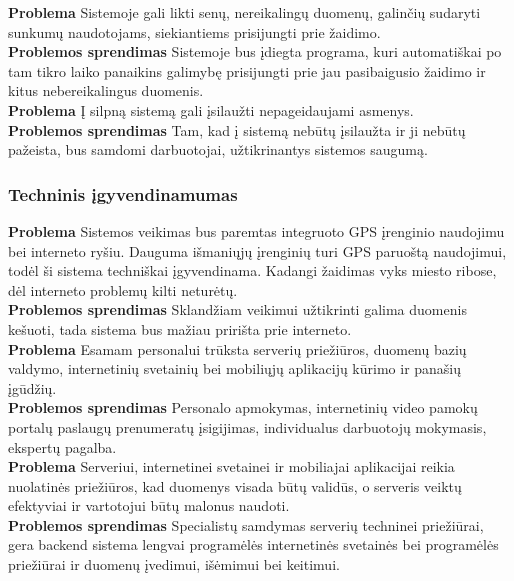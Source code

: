 \documentclass{VUMIFPSkursinis}
\begin{document}
		\noindent \textbf{Problema} Sistemoje gali likti senų, nereikalingų duomenų, galinčių sudaryti sunkumų naudotojams, siekiantiems prisijungti prie žaidimo. \\
		\noindent \textbf{Problemos sprendimas} Sistemoje bus įdiegta programa, kuri automatiškai po tam tikro laiko panaikins galimybę prisijungti prie jau pasibaigusio žaidimo ir kitus nebereikalingus duomenis. \\
		
		\noindent \textbf{Problema}  Į silpną sistemą gali įsilaužti nepageidaujami asmenys.\\
		\noindent \textbf{Problemos sprendimas} Tam, kad į sistemą nebūtų įsilaužta ir ji nebūtų pažeista, bus samdomi darbuotojai, užtikrinantys sistemos saugumą.  \\
		
	\subsubsection{Techninis įgyvendinamumas}
		\noindent \textbf{Problema} Sistemos veikimas bus paremtas integruoto GPS įrenginio naudojimu bei interneto ryšiu. Dauguma išmaniųjų įrenginių turi GPS paruoštą naudojimui, todėl ši sistema techniškai įgyvendinama. Kadangi žaidimas vyks miesto ribose, dėl interneto problemų kilti neturėtų. \\
		\noindent \textbf{Problemos sprendimas} Sklandžiam veikimui užtikrinti galima duomenis kešuoti, tada sistema bus mažiau pririšta prie interneto.\\
		
		\noindent \textbf{Problema} Esamam personalui trūksta serverių priežiūros, duomenų bazių valdymo, internetinių svetainių bei mobiliųjų aplikacijų kūrimo ir panašių įgūdžių.\\
		\noindent \textbf{Problemos sprendimas} Personalo apmokymas, internetinių video pamokų portalų paslaugų prenumeratų įsigijimas, individualus darbuotojų mokymasis, ekspertų pagalba. \\	
		
		\noindent \textbf{Problema} Serveriui, internetinei svetainei ir mobiliajai aplikacijai reikia nuolatinės priežiūros, kad duomenys visada būtų validūs, o serveris veiktų efektyviai ir vartotojui būtų malonus naudoti.\\
		\noindent \textbf{Problemos sprendimas} Specialistų samdymas serverių techninei priežiūrai, gera backend sistema lengvai programėlės internetinės svetainės bei programėlės priežiūrai ir duomenų įvedimui, išėmimui bei keitimui. \\
		
\end{document}
